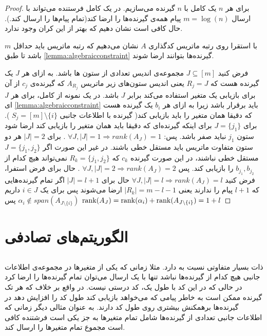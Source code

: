 \begin{proof}
	برای هر
	$n$
	یک 
	\picod
	کامل با
	$n$
	گیرنده می‌سازیم. در یک 
	\picod
	کامل فرستنده می‌تواند با ارسال
	$m = \log(n)$
	پیام همه‌ی گیرنده‌ها را ارضا کند(تمام پیام‌ها را ارسال کند.). حال کافی است نشان دهیم که بهتر از این کران وجود ندارد.
	
	با استقرا روی رتبه ماتریس کدگذاری 
	$A$
	نشان می‌دهیم که رتبه ماتریس باید حداقل 
	$m$
	باشد تا طبق
	\autoref{lemma:algebraicconstraint}
	گیرنده‌ها بتوانند ارضا شوند.
	
	فرض کنید
	$J \subseteq [m]$
	مجموعه‌ی اندیس تعدادی از ستون ها باشد. به ازای هر
	$J$
	یک گیرنده هست که 
	$R_j = J$
	یعنی اندیس ستون‌های زیر ماتریس
	$A_{R_j}$
	که گیرنده‌ی
	$c_j$
	از آن برای بازیابی یک متغیر استفاده می‌کند برابر
	$J$
	باشد. در یک نمونه از
	\picod
	کامل، برای هر
	$J$
	ای 
	\autoref{lemma:algebraicconstraint}
	باید برقرار باشد زیرا به ازای هر
	$b_i$
	یک گیرنده هست که دقیقا همان متغیر را باید بازیابی کند(
	گیرنده با اطلاعات جانبی
	$S_j = [m] \setminus \{i\}$
	). برای
	$J = \{j_1\}$
	برای اینکه گیرنده‌ای که دقیقا باید همان متغیر را بازیابی کند ارضا شود ستون
	$j_1$
	نباید صفر باشد. پس: 
	$\forall J, |J| = 1 \Rightarrow rank(A_J) = 1$
	. برای
	$|J| = 2$
	هر دو ستون متفاوت ماتریس باید مستقل خطی باشند. در غیر این صورت اگر
	$J = \{j_1, j_2\}$
	مستقل خطی نباشند، در این صورت گیرنده‌
	$c_k$
	که
	$R_k = \{j_1, j_2\}$
	نمی‌تواند هیچ کدام از 
	$b_{j_1}, b_{j_2}$
	را بازیابی کند. پس 
	$\forall J, |J| = 2 \Rightarrow rank(A_J) = 2$
	. حال برای فرض استفرا، فرض کنید
	$\forall J, |J| = l \Rightarrow rank(A_J) = l$
	حال برای
	$|J| = l + 1$
	اگر تمام گیرنده‌هایی که
	$l + 1$
	پیام را ندارند یعنی
	$|R_k| = m - l - 1 $
	ارضا می‌شوند پس برای یک
	$i \in J$
	داریم
	$\alpha_i \notin span(A_{J \setminus \{i\}})$
	پس
	$\operatorname{rank}(A_{J}) = \operatorname{rank}(\alpha_i) + \operatorname{rank}(A_{J \setminus \{i\}}) = 1 + l$
\end{proof}
\section{
الگوریتم‌های تصادفی
}
\subsection{
}
\picod
ذات بسیار متفاوتی نسبت به
\icod
دارد. مثلا زمانی که یکی از متغیرها در مجموعه‌ی اطلاعات جانبی هیچ کدام از گیرنده‌ها نباشد تنها با یک ارسال می‌توان تمام گیرنده‌ها را ارضا کرد در حالی که در
\icod
این کد با طول یک، کد درستی نیست. در واقع بر خلاف
\icod
که هر تک گیرنده ممکن است به خاطر پیامی که می‌خواهد بازیابی کند طول کد را افزایش دهد در
\picod
گیرنده‌ها برهمکنش بیشتری روی طول کد دارند. به عنوان مثالی دیگر زمانی که اطلاعات جانبی تعدادی از گیرنده‌ها شامل تمام متغیرها به جز یکی است فرشتنده کافی است مجموع تمام متغیرها را ارسال کند. 

